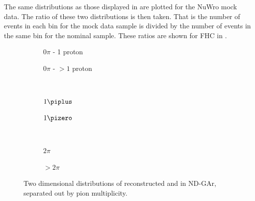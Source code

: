 The same distributions as those displayed in  are plotted for the NuWro mock data.
The ratio of these two distributions is then taken.
That is the number of events in each bin for the mock data sample is divided by the number of events in the same bin for the nominal sample.
These ratios are shown for FHC in .

\begin{figure}[t]
	\begin{subfigure}[t]{.5\linewidth}
		\begin{adjustbox}{max totalsize=\linewidth, center}
			
		\end{adjustbox}
		\caption{$0\pi$ - 1 proton}
	\end{subfigure}
	\hfill
	\begin{subfigure}[t]{.5\linewidth}
		\begin{adjustbox}{max totalsize=\linewidth, center}
			
		\end{adjustbox}
		\caption{$0\pi$ - $>1$ proton}
	\end{subfigure} \\
	\begin{subfigure}[t]{.5\linewidth}
		\begin{adjustbox}{max totalsize=\linewidth, center}
			
		\end{adjustbox}
		\caption{$1\piplus$}
	\end{subfigure}
	\hfill
	\begin{subfigure}[t]{.5\linewidth}
		\begin{adjustbox}{max totalsize=\linewidth, center}
			
		\end{adjustbox}
		\caption{$1\pizero$}
	\end{subfigure} \\
	\begin{subfigure}[t]{.5\linewidth}
		\begin{adjustbox}{max totalsize=\linewidth, center}
			
		\end{adjustbox}
		\caption{$2\pi$}
	\end{subfigure}
	\hfill
	\begin{subfigure}[t]{.5\linewidth}
		\begin{adjustbox}{max totalsize=\linewidth, center}
			
		\end{adjustbox}
		\caption{$>2\pi$}
	\end{subfigure}
	\caption[Ratio of NuWro to GENIE of two-dimensional distributions of \evis and \pvis in ND-GAr]{Two dimensional distributions of reconstructed \evis and \pvis in ND-GAr, separated out by pion multiplicity.}
	\label{fig:q0q3RatioFhc}
\end{figure}

